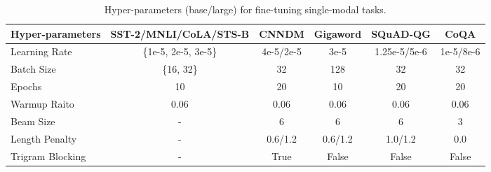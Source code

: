 \documentclass[11pt,a4paper]{article}
\begin{document}
\begin{table*}[t!]
\centering
\small
\begin{tabular}{l|c|c|c|c|c}
\hline
Hyper-parameters & SST-2/MNLI/CoLA/STS-B & CNNDM & Gigaword & SQuAD-QG & CoQA \\
\hline
Learning Rate & \{1e-5, 2e-5, 3e-5\} & 4e-5/2e-5 & 3e-5 & 1.25e-5/5e-6 & 1e-5/8e-6 \\
Batch Size & \{16, 32\} & 32 & 128 & 32 & 32 \\
Epochs & 10 & 20 & 10 & 20 & 20 \\
Warmup Raito & 0.06 & 0.06 & 0.06 & 0.06 & 0.06 \\
Beam Size & - & 6 & 6 & 6 & 3 \\
Length Penalty & - & 0.6/1.2 & 0.6/1.2 & 1.0/1.2 & 0.0 \\
Trigram Blocking & - &True & False & False & False \\
\hline
\end{tabular}
\caption{\label{gen-params}
Hyper-parameters (base/large) for fine-tuning single-modal tasks.}
\end{table*}
\end{document}
